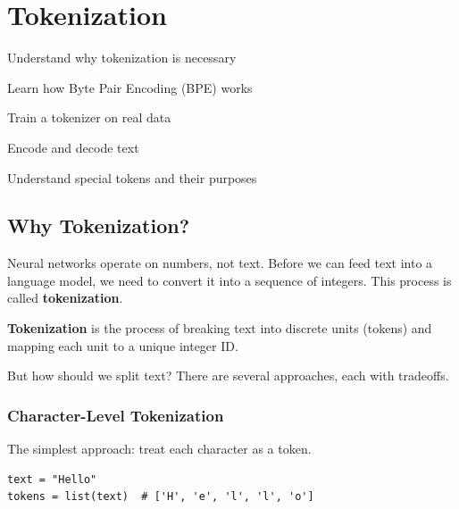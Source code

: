 \chapter{Tokenization}
\label{ch:tokenization}

\begin{objectives}
    \item Understand why tokenization is necessary
    \item Learn how Byte Pair Encoding (BPE) works
    \item Train a tokenizer on real data
    \item Encode and decode text
    \item Understand special tokens and their purposes
\end{objectives}

\section{Why Tokenization?}

Neural networks operate on numbers, not text. Before we can feed text into a language model, we need to convert it into a sequence of integers. This process is called \textbf{tokenization}.

\begin{definition}[title=Tokenization]
\textbf{Tokenization} is the process of breaking text into discrete units (tokens) and mapping each unit to a unique integer ID.
\end{definition}

But how should we split text? There are several approaches, each with tradeoffs.

\subsection{Character-Level Tokenization}

The simplest approach: treat each character as a token.

\begin{lstlisting}[style=python]
text = "Hello"
tokens = list(text)  # ['H', 'e', 'l', 'l', 'o']
\end{lstlisting}

